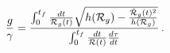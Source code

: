\begin{equation}\label{ratio}
{g \over \gamma} = { {\int_0 ^{t_f} {{dt}\over {{\cal R}_g(t)}}
\sqrt{h({\cal R}_g)- {{\dot {\cal R}_g(t)^2}\over {h({\cal R}_g)}}}}
\over {\int_0 ^{t_f} {{dt}\over {{\cal R}(t)}} {{d\tau}\over{dt}}} }
\, . 
\end{equation}


